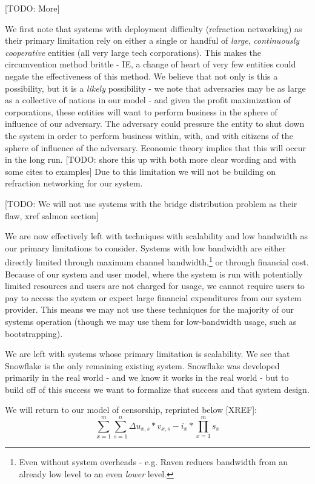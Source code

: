 \documentclass[12pt]{report}
\begin{document}
[TODO: More]

We first note that systems with deployment difficulty (refraction networking) as their primary limitation rely on either a single or handful of \emph{large}, \emph{continuously cooperative} entities (all very large tech corporations). This makes the circumvention method brittle - IE, a change of heart of very few entities could negate the effectiveness of this method. We believe that not only is this a possibility, but it is a \emph{likely} possibility - we note that adversaries may be as large as a collective of nations in our model - and given the profit maximization of corporations, these entities will want to perform business in the sphere of influence of our adversary. The adversary could pressure the entity to shut down the system in order to perform business within, with, and with citizens of the sphere of influence of the adversary. Economic theory implies that this will occur in the long run. [TODO: shore this up with both more clear wording and with some cites to examples] Due to this limitation we will not be building on refraction networking for our system.

[TODO: We will not use systems with the bridge distribution problem as their flaw, xref salmon section]

We are now effectively left with techniques with scalability and low bandwidth as our primary limitations to consider. Systems with low bandwidth are either directly limited through maximum channel bandwidth,\footnote{Even without system overheads - e.g. Raven reduces bandwidth from an already low level to an even \emph{lower} level.} or through financial cost. Because of our system and user model, where the system is run with potentially limited resources and users are not charged for usage, we cannot require users to pay to access the system or expect large financial expenditures from our system provider. This means we may not use these techniques for the majority of our systems operation (though we may use them for low-bandwidth usage, such as bootstrapping).

We are left with systems whose primary limitation is scalability. We see that Snowflake is the only remaining existing system. Snowflake was developed primarily in the real world - and we know it works in the real world - but to build off of this success we want to formalize that success and that system design.

We will return to our model of censorship, reprinted below [XREF]:
\begin{equation}
\sum_{x=1}^{m}\sum_{s=1}^{n}\Delta u_{x,s}*v_{x,s} - i_{x} * \prod_{x=1}^{m}s_x
\end{equation}
\end{document}
